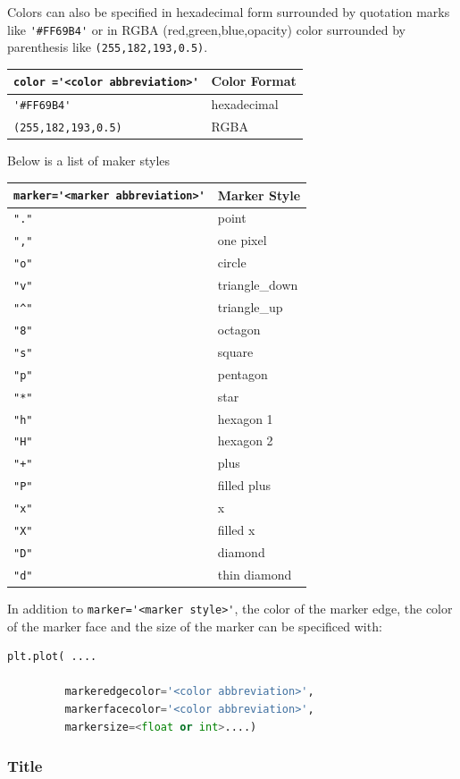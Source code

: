 \documentclass{book}
\begin{document}
Colors can also be specified in hexadecimal form surrounded by quotation
marks like \lstinline!'#FF69B4'! or in RGBA (red,green,blue,opacity)
color surrounded by parenthesis like \lstinline!(255,182,193,0.5)!.

\begin{longtable}[]{@{}ll@{}}
\toprule
\lstinline!color ='<color abbreviation>'! & Color Format\tabularnewline
\midrule
\endhead
\lstinline!'#FF69B4'! & hexadecimal\tabularnewline
\lstinline!(255,182,193,0.5)! & RGBA\tabularnewline
\bottomrule
\end{longtable}

Below is a list of maker styles

\begin{longtable}[]{@{}ll@{}}
\toprule
\lstinline!marker='<marker abbreviation>'! & Marker Style\tabularnewline
\midrule
\endhead
\lstinline!"."! & point\tabularnewline
\lstinline!","! & one pixel\tabularnewline
\lstinline!"o"! & circle\tabularnewline
\lstinline!"v"! & triangle\_down\tabularnewline
\lstinline!"^"! & triangle\_up\tabularnewline
\lstinline!"8"! & octagon\tabularnewline
\lstinline!"s"! & square\tabularnewline
\lstinline!"p"! & pentagon\tabularnewline
\lstinline!"*"! & star\tabularnewline
\lstinline!"h"! & hexagon 1\tabularnewline
\lstinline!"H"! & hexagon 2\tabularnewline
\lstinline!"+"! & plus\tabularnewline
\lstinline!"P"! & filled plus\tabularnewline
\lstinline!"x"! & x\tabularnewline
\lstinline!"X"! & filled x\tabularnewline
\lstinline!"D"! & diamond\tabularnewline
\lstinline!"d"! & thin diamond\tabularnewline
\bottomrule
\end{longtable}

In addition to \lstinline!marker='<marker style>'!, the color of the
marker edge, the color of the marker face and the size of the marker can
be specificed with:

\begin{lstlisting}[language=Python]
plt.plot( .... 
         
         markeredgecolor='<color abbreviation>',
         markerfacecolor='<color abbreviation>',
         markersize=<float or int>....)
\end{lstlisting}
    




    
        \subsubsection{Title}\label{title}
\end{document}
